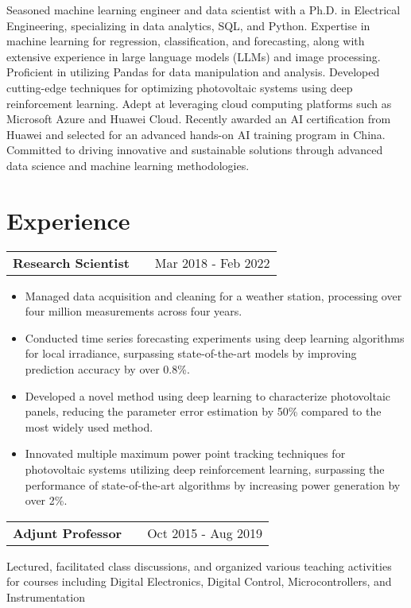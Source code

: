 \documentclass[a4paper,10pt]{article}
\makeatletter
\newenvironment{jobshort}[2]
    {
    \begin{tabularx}{\linewidth}{@{}l X r@{}}
    \textbf{#1} & \hfill &  #2 \\[3.75pt]
    \end{tabularx}
    }
    {
    }
\newenvironment{joblong}[2]
    {
    \begin{tabularx}{\linewidth}{@{}l X r@{}}
    \textbf{#1} & \hfill &  #2 \\[3.75pt]
    \end{tabularx}
    \begin{minipage}[t]{\linewidth}
    \begin{itemize}[nosep,after=\strut, leftmargin=1em, itemsep=3pt,label=--]
    }
    {
    \end{itemize}
    \end{minipage}    
    }
\makeatother
\begin{document}
Seasoned machine learning engineer and data scientist with a Ph.D. in Electrical Engineering, specializing in data analytics, SQL, and Python. Expertise in machine learning for regression, classification, and forecasting, along with extensive experience in large language models (LLMs) and image processing. Proficient in utilizing Pandas for data manipulation and analysis. Developed cutting-edge techniques for optimizing photovoltaic systems using deep reinforcement learning. Adept at leveraging cloud computing platforms such as Microsoft Azure and Huawei Cloud. Recently awarded an AI certification from Huawei and selected for an advanced hands-on AI training program in China. Committed to driving innovative and sustainable solutions through advanced data science and machine learning methodologies.

\section{Experience}

\begin{joblong}{Research Scientist}{Mar 2018 - Feb 2022}
\item Managed data acquisition and cleaning for a weather station, processing over four million measurements across four years.
\item Conducted time series forecasting experiments using deep learning algorithms for local irradiance, surpassing state-of-the-art models by improving prediction accuracy by over 0.8\%.
\item Developed a novel method using deep learning to characterize photovoltaic panels, reducing the parameter error estimation by 50\% compared to the most widely used method.
\item Innovated multiple maximum power point tracking techniques for photovoltaic systems utilizing deep reinforcement learning, surpassing the performance of state-of-the-art algorithms by increasing power generation by over 2\%.
\end{joblong}

\begin{jobshort}{Adjunt Professor}{Oct 2015 - Aug 2019}
Lectured, facilitated class discussions, and organized various teaching activities for courses including Digital Electronics, Digital Control, Microcontrollers, and Instrumentation
\end{jobshort}


\end{document}
